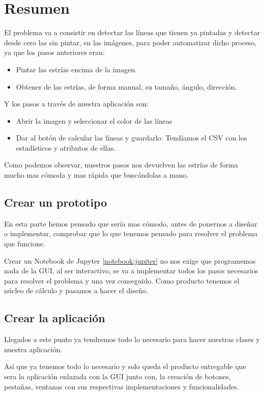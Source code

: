 \section{Resumen}

El problema va a consistir en detectar las líneas que tienen ya pintadas y detectar desde cero las sin pintar, en las imágenes, para poder automatizar dicho proceso, ya que los pasos anteriores eran:
\begin{itemize}
\item Pintar las estrías encima de la imagen.
\item Obtener de las estrías, de forma manual, su tamaño, ángulo, dirección.
\end{itemize}
Y los pasos a través de nuestra aplicación son:
\begin{itemize}
\item Abrir la imagen y seleccionar el color de las líneas
\item Dar al botón de calcular las líneas y guardarlo: Tendíamos el CSV con los estadísticos y atributos de ellas.
\end{itemize}
Como podemos observar, nuestros pasos nos devuelven las estrías de forma mucho mas cómoda y mas rápida que buscándolas a mano.

\subsection{Crear un prototipo} 
En esta parte hemos pensado que sería mas cómodo, antes de ponernos a diseñar o implementar, comprobar que lo que tenemos pensado para resolver el problema que funcione.

Crear un Notebook de Jupyter \ref{notebook:jupiter} no nos exige que programemos nada de la GUI, al ser interactivo, se va a implementar todos los pasos necesarios para resolver el problema y una vez conseguido. Como producto tenemos el núcleo de cálculo y pasamos a hacer el diseño.

\subsection{Crear la aplicación}
Llegados a este punto ya tendremos todo lo necesario para hacer nuestras clases y nuestra aplicación.

Así que ya tenemos todo lo necesario y solo queda el producto entregable que sera la aplicación enlazada con la GUI junto con, la creación de botones, pestañas, ventanas con sus respectivas implementaciones y funcionalidades.
